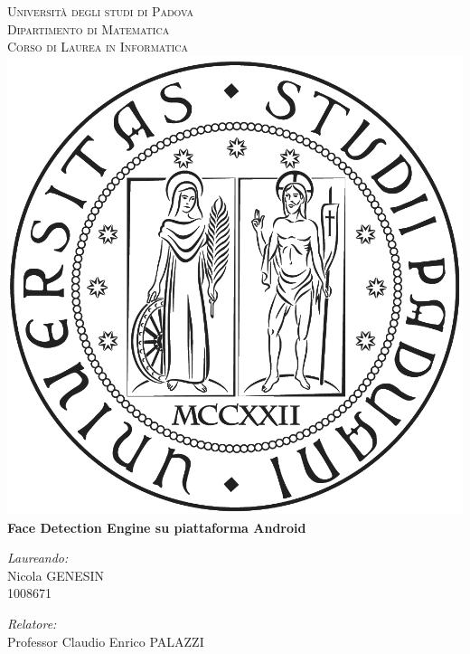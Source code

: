 \documentclass[10pt, a4paper, oneside]{Thesis} %
\begin{document}
\begin{titlepage}
\begin{center}


\vspace*{10 mm}
\textsc{\LARGE Università degli studi di Padova}\\[0.5cm] %
\textsc{\Large Dipartimento di Matematica \\
Corso di Laurea in Informatica}\\[1.0cm] %

\includegraphics[scale=0.15]{../Figures/logo_uni_bw.png}\\[1.5cm]

{\huge \bfseries Face Detection Engine su piattaforma Android}\\[2.5cm] %
 
\begin{minipage}{0.4\textwidth}
\begin{flushleft} \large
\emph{Laureando:}\\
{Nicola GENESIN \\ 1008671} %
\end{flushleft}
\end{minipage}
\begin{minipage}{0.4\textwidth}
\begin{flushright} \large
\emph{Relatore:} \\
{Professor Claudio Enrico PALAZZI} %
\end{flushright}
\end{minipage}\\[3cm]
 

\end{center}
\end{titlepage}
\end{document}
